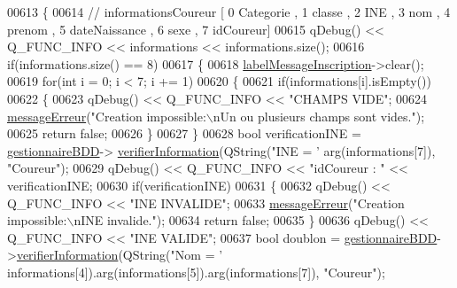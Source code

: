 \begin{DoxyCode}
00613 \{
00614     \textcolor{comment}{// informationsCoureur [ 0 Categorie , 1 classe , 2 INE , 3 nom , 4 prenom , 5 dateNaissance , 6 sexe ,
       7 idCoureur]}
00615     qDebug() << Q\_FUNC\_INFO << informations << informations.size();
00616     \textcolor{keywordflow}{if}(informations.size() == 8)
00617     \{
00618         \hyperlink{class_i_h_m_gestion_cross_a1855bd63290c39c20660064b41710e8c}{labelMessageInscription}->clear();
00619         \textcolor{keywordflow}{for}(\textcolor{keywordtype}{int} i = 0;  i < 7; i += 1)
00620         \{
00621             \textcolor{keywordflow}{if}(informations[i].isEmpty())
00622             \{
00623                 qDebug() << Q\_FUNC\_INFO << \textcolor{stringliteral}{"CHAMPS VIDE"};
00624                 \hyperlink{class_i_h_m_gestion_cross_a92fa6016b00d2d4429c901e77d37bf10}{messageErreur}(\textcolor{stringliteral}{"Creation impossible:\(\backslash\)nUn ou plusieurs champs sont vides."});
00625                 \textcolor{keywordflow}{return} \textcolor{keyword}{false};
00626             \}
00627         \}
00628         \textcolor{keywordtype}{bool} verificationINE = \hyperlink{class_i_h_m_gestion_cross_a440bac63a3e51db3e2c08e883f8cafc9}{gestionnaireBDD}->
      \hyperlink{class_gestion_b_d_d_abfd3cfb9553a83aafd86c3149869d6c0}{verifierInformation}(QString(\textcolor{stringliteral}{"INE = '%
      arg(informations[7]), \textcolor{stringliteral}{"Coureur"});
00629         qDebug() << Q\_FUNC\_INFO << \textcolor{stringliteral}{"idCoureur : "} << verificationINE;
00630         \textcolor{keywordflow}{if}(verificationINE)
00631         \{
00632             qDebug() << Q\_FUNC\_INFO << \textcolor{stringliteral}{"INE INVALIDE"};
00633             \hyperlink{class_i_h_m_gestion_cross_a92fa6016b00d2d4429c901e77d37bf10}{messageErreur}(\textcolor{stringliteral}{"Creation impossible:\(\backslash\)nINE invalide."});
00634             \textcolor{keywordflow}{return} \textcolor{keyword}{false};
00635         \}
00636         qDebug() << Q\_FUNC\_INFO << \textcolor{stringliteral}{"INE VALIDE"};
00637         \textcolor{keywordtype}{bool} doublon = \hyperlink{class_i_h_m_gestion_cross_a440bac63a3e51db3e2c08e883f8cafc9}{gestionnaireBDD}->\hyperlink{class_gestion_b_d_d_abfd3cfb9553a83aafd86c3149869d6c0}{verifierInformation}(QString(\textcolor{stringliteral}{"Nom
       = '%
      informations[4]).arg(informations[5]).arg(informations[7]), \textcolor{stringliteral}{"Coureur"});
}}
\end{DoxyCode}
